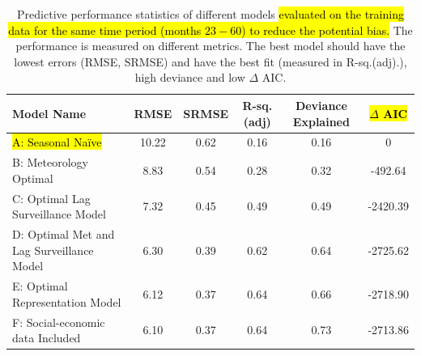 \documentclass{bmcart}
\begin{document}
\begin{table}[h!]
	\centering
	\begin{tabular}{|lccccc|}
		\hline
		\textbf{Model Name} & \textbf{RMSE} & \textbf{SRMSE} & \textbf{R-sq.(adj)} & \textbf{Deviance Explained} & \hl{\textbf{$\Delta$ AIC}} \\ 
		\hline
		\hl{A: Seasonal Na\"{i}ve}  & 10.22 & 0.62 & 0.16 & 0.16 & 0\\ 
		B: Meteorology Optimal & 8.83 & 0.54 & 0.28 & 0.32 & -492.64\\ 
		C: Optimal Lag Surveillance Model  &  7.32 & 0.45 & 0.49 & 0.49 & -2420.39 \\ 
		D: Optimal Met and Lag Surveillance Model  & 6.30 & 0.39 & 0.62 & 0.64 &  -2725.62\\ 
		E: Optimal Representation Model & 6.12 & 0.37 & 0.64 & 0.66 & -2718.90\\ 
		F: Social-economic data Included & 6.10 & 0.37 & 0.64 & 0.73 & -2713.86 \\ 
		\hline
	\end{tabular}
	\caption{Predictive performance statistics of different models \hl{evaluated on the training data for the same time period  (months $23-60$) to reduce the potential bias.} The performance is measured on different metrics. The best model should have the lowest errors (RMSE, SRMSE) and have the best fit (measured in R-sq.(adj).), high deviance and low $\Delta$ AIC.}
	\label{resultsPrediction}
\end{table}











\end{document}
